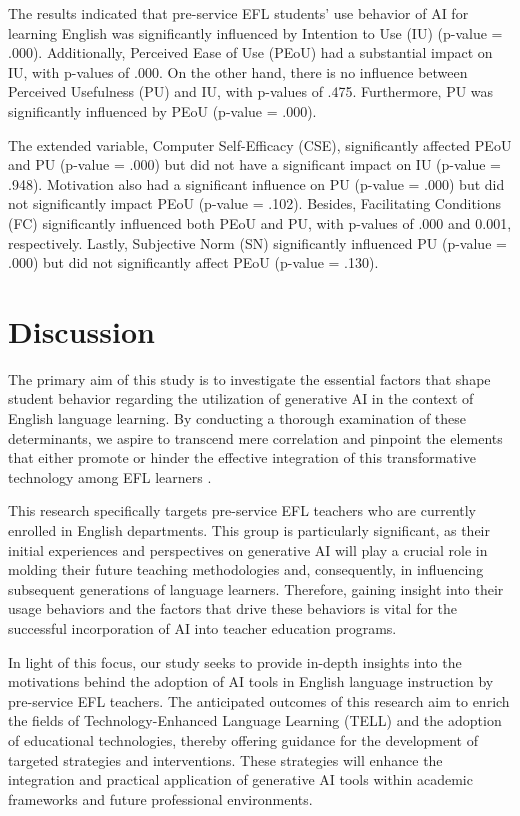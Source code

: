 \documentclass[english]{textolivre}
\begin{document}
The results indicated that pre-service EFL students’ use behavior of AI for learning English was significantly influenced by Intention to Use (IU) (p-value = .000). Additionally, Perceived Ease of Use (PEoU) had a substantial impact on IU, with p-values of .000. On the other hand, there is no influence between Perceived Usefulness (PU) and IU, with p-values of .475. Furthermore, PU was significantly influenced by PEoU (p-value = .000).

The extended variable, Computer Self-Efficacy (CSE), significantly affected PEoU and PU (p-value = .000) but did not have a significant impact on IU (p-value = .948). Motivation also had a significant influence on PU (p-value = .000) but did not significantly impact PEoU (p-value = .102). Besides, Facilitating Conditions (FC) significantly influenced both PEoU and PU, with p-values of .000 and 0.001, respectively. Lastly, Subjective Norm (SN) significantly influenced PU (p-value = .000) but did not significantly affect PEoU (p-value = .130).

\section{Discussion}\label{sec-links}
The primary aim of this study is to investigate the essential factors that shape student behavior regarding the utilization of generative AI in the context of English language learning. By conducting a thorough examination of these determinants, we aspire to transcend mere correlation and pinpoint the elements that either promote or hinder the effective integration of this transformative technology among EFL learners \cite{WangDuZou2025MultimodalAI}.

This research specifically targets pre-service EFL teachers who are currently enrolled in English departments. This group is particularly significant, as their initial experiences and perspectives on generative AI will play a crucial role in molding their future teaching methodologies and, consequently, in influencing subsequent generations of language learners. Therefore, gaining insight into their usage behaviors and the factors that drive these behaviors is vital for the successful incorporation of AI into teacher education programs.

In light of this focus, our study seeks to provide in-depth insights into the motivations behind the adoption of AI tools in English language instruction by pre-service EFL teachers. The anticipated outcomes of this research aim to enrich the fields of Technology-Enhanced Language Learning (TELL) and the adoption of educational technologies, thereby offering guidance for the development of targeted strategies and interventions. These strategies will enhance the integration and practical application of generative AI tools within academic frameworks and future professional environments.
\end{document}
